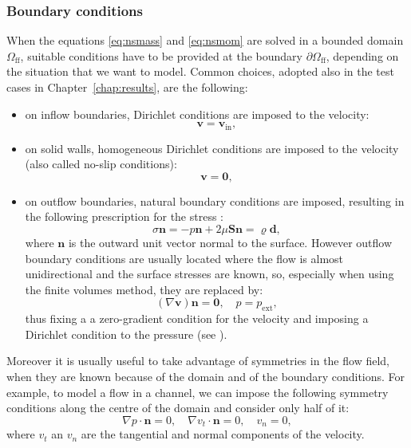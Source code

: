 \subsubsection{Boundary conditions}
When the equations \eqref{eq:nsmass} and \eqref{eq:nsmom} are solved in a 
bounded domain $\Omega_\text{ff}$, suitable conditions have to be provided at 
the boundary $\partial \Omega_\text{ff}$, depending on the situation that we 
want to model. Common choices, adopted also in the test cases in Chapter~\ref{chap:results}, are the following:
\begin{itemize}
	\item on inflow boundaries, Dirichlet conditions are imposed to the 
	velocity:
	\begin{equation} \label{eq:inflow}
		\mathbf{v} = \mathbf{v}_\text{in},
	\end{equation}
	\item on solid walls, homogeneous Dirichlet conditions are imposed to the 
	velocity (also called no-slip conditions):
	\begin{equation} \label{eq:noslip}
		\mathbf{v} = \mathbf{0},
	\end{equation}
	\item on outflow boundaries, natural boundary conditions are imposed, 
	resulting in the following prescription for the stress :
	\begin{equation}
		\sigma \mathbf{n} = -p\mathbf{n}+2\mu \mathbf{Sn} = \varrho\mathbf{d},
	\end{equation}
	where $\mathbf{n}$ is the outward unit vector normal to the surface. 
	However outflow boundary conditions are usually located where the flow is 
	almost unidirectional and the surface stresses are known, so, especially 
	when using the finite volumes method, they are replaced by:
	\begin{equation} \label{eq:outflow}
	(\nabla \mathbf{v})\mathbf{n} = \mathbf{0}, \quad p = p_\text{ext},
	\end{equation}
	thus fixing a a zero-gradient condition for the velocity and imposing a 
	Dirichlet condition to the pressure (see \cite{main:vermal}).
\end{itemize}
Moreover it is usually useful to take advantage of symmetries in the flow 
field, 
when they are known because of the domain and of the boundary conditions. 
For example, to model a flow in a channel, we can impose the following 
symmetry conditions along the centre of the domain and consider only half of it:
\begin{equation}
\nabla p \cdot \mathbf{n} = 0, \quad \nabla v_t \cdot \mathbf{n} = 0, \quad
v_n = 0,
\end{equation}
where $v_t$ an $v_n$ are the tangential and normal components of the velocity.
%
